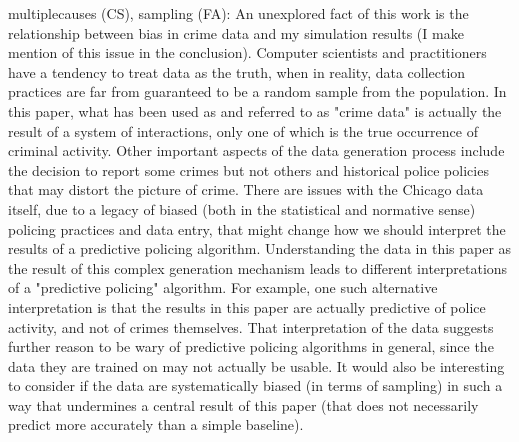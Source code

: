 \begin{itemize}
\hashtag multiplecauses (CS), sampling (FA): An unexplored fact of this work is the relationship between bias in crime data and my simulation results (I make mention of this issue in the conclusion). Computer scientists and practitioners have a tendency to treat data as the truth, when in reality, data collection practices are far from guaranteed to be a random sample from the population. In this paper, what has been used as and referred to as "crime data" is actually the result of a system of interactions, only one of which is the true occurrence of criminal activity. Other important aspects of the data generation process include the decision to report some crimes but not others and historical police policies that may distort the picture of crime. There are issues with the Chicago data itself, due to a legacy of biased (both in the statistical and normative sense) policing practices and data entry, that might change how we should interpret the results of a predictive policing algorithm. Understanding the data in this paper as the result of this complex generation mechanism leads to different interpretations of a "predictive policing" algorithm. For example, one such alternative interpretation is that the results in this paper are actually predictive of police activity, and not of crimes themselves. That interpretation of the data suggests further reason to be wary of predictive policing algorithms in general, since the data they are trained on may not actually be usable. It would also be interesting to consider if the data are systematically biased (in terms of sampling) in such a way that undermines a central result of this paper (that \pp does not necessarily predict more accurately than a simple baseline).





\end{itemize}
